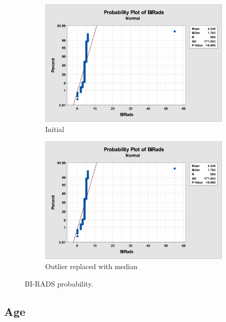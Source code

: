 \documentclass[12pt]{article}
\begin{document}
        \begin{figure}[H]
          \begin{subfigure}[b]{0.45\textwidth}
            \includegraphics[width=\textwidth]{birads-probability}
            \caption{Initial}
            \label{fig:birads-probability}
          \end{subfigure}
          \hfill
          \begin{subfigure}[b]{0.45\textwidth}
            \includegraphics[width=\textwidth]{birads-probability}
            \caption{Outlier replaced with median}
            \label{fig:birads-probability}
          \end{subfigure}
          \caption{BI-RADS probability.}
        \end{figure}

    \subsection{Age}
\end{document}
